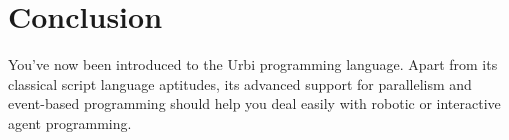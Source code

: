 \documentclass[openright,twoside,12pt]{report}
\newcommand{\urbi}{Urbi\xspace}
\begin{document}







\chapter{Conclusion}

You've now been introduced to the \urbi programming language. Apart
from its classical script language aptitudes, its advanced support for
parallelism and event-based programming should help you deal easily
with robotic or interactive agent programming.
\end{document}
